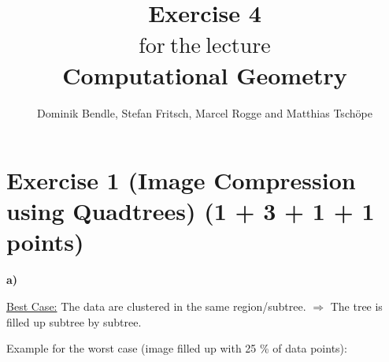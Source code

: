 \documentclass[english, fontsize=12pt, paper=a4, twoside=false, draft=true, pagesize=auto, version=last, DIV=16]{scrartcl}
\theoremstyle{break}
\begin{document}
\title{
\vspace*{-10mm}
Exercise 4 \\[-3pt]
{\Large $\mathrm{for \ the \ lecture}$} \\[-3pt]
{\LARGE \textbf{Computational Geometry}}
}
\author{Dominik Bendle, Stefan Fritsch, Marcel Rogge and Matthias Tschöpe}
\maketitle
\vspace*{-10mm}

\section*{\large Exercise 1 (Image Compression using Quadtrees) {\normalsize \hfill (1 + 3 + 1 + 1 points)}}
\textbf{a)} \par
\underline{Best Case:} The data are clustered in the same region/subtree.
$\Rightarrow$ The tree is filled up subtree by subtree. \par
Example for the worst case (image filled up with 25 \% of data points): \par
\vspace*{-7mm}
\begin{minipage}[t]{0.48\textwidth}
\begin{figure}[H]
\centering
{}
\label{Result after step 1}
\end{figure} \par
\end{minipage} \hspace*{5mm}
\end{document}
